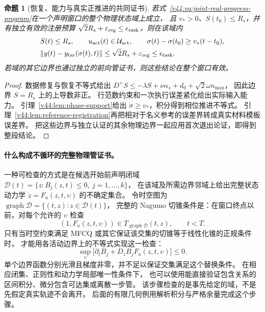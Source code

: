 \documentclass[11pt,a4paper]{article}
\numberwithin{equation}{section}
\newtheorem{proposition}[theorem]{命题}
\theoremstyle{definition}
\begin{document}
\begin{proposition}[恢复、能力与真实正推进的共同证书]
\label{v44:prop:joint-certificate}
若式~\eqref{v44:eq:joint-real-progress-program}在一个声明窗口的整个物理状态域上成立，
且 $v_*>0$、$S(t_0)\le R_s$，并有独立有效的注册预算
$\sqrt2R_s+\varepsilon_{\rm reg}\le\epsilon_{\rm task}$，则在该域内
\begin{equation}
 \begin{aligned}
 &S(t)\le R_s,\qquad u_{\rm act}(t)\in\mathcal U_{\rm act},
 \qquad \sigma(t)-\sigma(t_0)\ge v_*(t-t_0),\\
 &\|y(t)-y_{\rm tar}(\sigma(t),t)\|
      \le\sqrt2R_s+\varepsilon_{\rm reg}\le\epsilon_{\rm task}.
 \end{aligned}
 \label{v44:eq:joint-guarantee}
\end{equation}
若域的其它边界也通过独立的前向管证书，则这些结论在整个窗口有效。
\end{proposition}
\begin{proof}
数据修复与恢复不等式给出
$D^+S\le-\lambda S+\nu\alpha_s+d_0+\sqrt2\omega n_{\max}$，
因此边界 $S=R_s$ 上的上导数非正。
行范数约束和一次执行误差紧化给出实际输入能力。
引理~\ref{v44:lem:phase-support}给出 $\dot\sigma\ge v_*$，积分得到相位推进不等式。
引理~\ref{v44:lem:reference-registration}再把相对于名义参考的误差界转成真实材料模板误差界。
把这些边界与独立认证的其余物理边界一起应用首次退出论证，即得到整段结论。
\end{proof}

\paragraph{什么构成不循环的完整物理管证书。}
一种可检查的方式是在候选开始前声明闭域
$\mathcal D(t)=\{z:B_j(z,t)\le0,\ j=1,\ldots,k\}$，
在该域及所需边界邻域上给出完整状态动力学 $\dot z=F_a(z,t,\upsilon)$ 的不确定集合。
令时空图为 $\operatorname{graph}\mathcal D=\{(t,z):z\in\mathcal D(t)\}$，
完整的 Nagumo 切锥条件是：在窗口终点以前，对每个允许的 $\upsilon$ 检查
\begin{equation}
 (1,F_a(z,t,\upsilon))\in
 T_{\operatorname{graph}\mathcal D}(t,z),\qquad t<T.
 \label{v44:eq:full-state-graph-tangency}
\end{equation}
只有当时空约束满足 MFCQ 或其它保证该交集的切锥等于线性化锥的正规条件时，
才能用各活动边界上的不等式实现这一检查：
\begin{equation}
 \sup_{\upsilon}\bigl[\partial_t B_j+D_zB_jF_a(z,t,\upsilon)\bigr]\le0.
 \label{v44:eq:full-state-boundary-certificate}
\end{equation}
单个边界函数分别光滑且梯度非零，并不足以保证交集满足这个替换条件。
在相应闭集、正则性和动力学局部唯一性条件下，
也可以使用能直接验证包含关系的
区间积分、微分包含可达集或离散一步管。
该步骤检查的是事先给定的域，不是先假定真实轨迹不会离开。
后面的有限几何例用解析积分与严格余量完成这个步骤。
\end{document}

